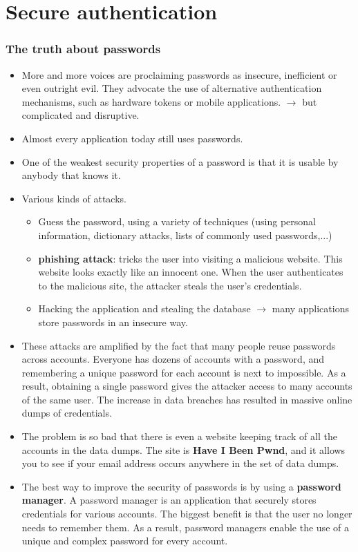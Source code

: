 \documentclass[../main.tex]{subfiles}
\begin{document}
\section{Secure authentication}
\subsubsection{The truth about passwords}
\begin{itemize}
\item More and more voices are proclaiming passwords as insecure, inefficient or even outright evil. They advocate the use of alternative authentication mechanisms, such as hardware tokens or mobile applications. $\rightarrow$ but complicated and disruptive.
\item Almost every application today still uses passwords.
\item One of the weakest security properties of a password is that it is usable by anybody that knows it.
\item Various kinds of attacks.
\begin{itemize}
\item Guess the password, using a variety of techniques (using personal information, dictionary attacks, lists of commonly used passwords,...)
\item \textbf{phishing attack}: tricks the user into visiting a malicious website. This website looks exactly like an innocent one. When the user authenticates to the malicious site, the attacker steals the user’s credentials.
\item Hacking the application and stealing the database $\rightarrow$ many applications store passwords in an insecure way.
\end{itemize}
\item These attacks are amplified by the fact that many people reuse passwords across accounts. Everyone has dozens of accounts with a password, and remembering a unique password for each account is next to impossible. As a result, obtaining a single password gives the attacker access to many accounts of the same user. The increase in data breaches has resulted in massive online dumps of credentials.
\item The problem is so bad that there is even a website keeping track of all the accounts in the data dumps. The site is \textbf{Have I Been Pwnd}, and it allows you to see if your email address occurs anywhere in the set of data dumps.
\item The best way to improve the security of passwords is by using a \textbf{password manager}. A password manager is an application that securely stores credentials for various accounts. The biggest benefit is that the user no longer needs to remember them. As a result, password managers enable the use of a unique and complex password for every account.

\end{itemize}
\end{document}

